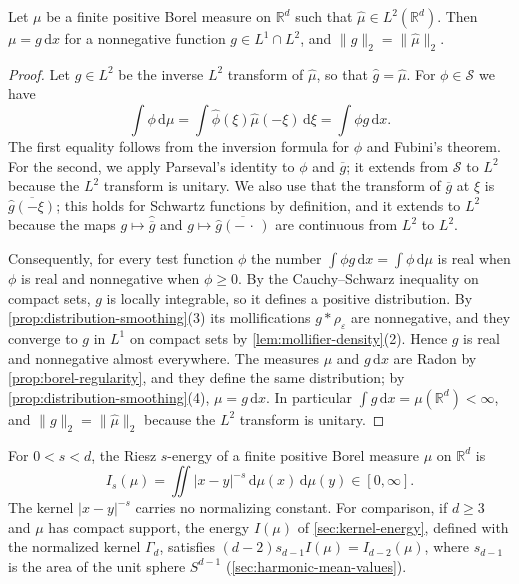 \begin{proposition}\label{prop:measure-fourier-l2}
Let $\mu$ be a finite positive Borel measure on $\mathbb R^d$ such that $\widehat\mu\in L^2(\mathbb R^d)$. Then $\mu=g\,\mathrm d x$ for a nonnegative function $g\in L^1\cap L^2$, and $\|g\|_2=\|\widehat\mu\|_2$.
\end{proposition}
\begin{proof}
Let $g\in L^2$ be the inverse $L^2$ transform of $\widehat\mu$, so that $\widehat g=\widehat\mu$. For $\phi\in\mathcal S$ we have
\[
 \int\phi\,\mathrm d\mu=\int\widehat\phi(\xi)\widehat\mu(-\xi)\,\mathrm d\xi=\int\phi g\,\mathrm d x.
\]
The first equality follows from the inversion formula for $\phi$ and Fubini's theorem. For the second, we apply Parseval's identity to $\phi$ and $\overline g$; it extends from $\mathcal S$ to $L^2$ because the $L^2$ transform is unitary. We also use that the transform of $\overline g$ at $\xi$ is $\overline{\widehat g(-\xi)}$; this holds for Schwartz functions by definition, and it extends to $L^2$ because the maps $g\mapsto\widehat{\overline g}$ and $g\mapsto\overline{\widehat g(-\,\cdot\,)}$ are continuous from $L^2$ to $L^2$.

Consequently, for every test function $\phi$ the number $\int\phi g\,\mathrm d x=\int\phi\,\mathrm d\mu$ is real when $\phi$ is real and nonnegative when $\phi\geq0$. By the Cauchy--Schwarz inequality on compact sets, $g$ is locally integrable, so it defines a positive distribution. By \cref{prop:distribution-smoothing}(3) its mollifications $g*\rho_\varepsilon$ are nonnegative, and they converge to $g$ in $L^1$ on compact sets by \cref{lem:mollifier-density}(2). Hence $g$ is real and nonnegative almost everywhere. The measures $\mu$ and $g\,\mathrm d x$ are Radon by \cref{prop:borel-regularity}, and they define the same distribution; by \cref{prop:distribution-smoothing}(4), $\mu=g\,\mathrm d x$. In particular $\int g\,\mathrm d x=\mu(\mathbb R^d)<\infty$, and $\|g\|_2=\|\widehat\mu\|_2$ because the $L^2$ transform is unitary.
\end{proof}

For $0<s<d$, the Riesz $s$-energy of a finite positive Borel measure $\mu$ on $\mathbb R^d$ is
\[
 I_s(\mu)=\iint|x-y|^{-s}\,\mathrm d\mu(x)\,\mathrm d\mu(y)\in[0,\infty].
\]
The kernel $|x-y|^{-s}$ carries no normalizing constant. For comparison, if $d\geq3$ and $\mu$ has compact support, the energy $I(\mu)$ of \cref{sec:kernel-energy}, defined with the normalized kernel $\Gamma_d$, satisfies $(d-2)s_{d-1}I(\mu)=I_{d-2}(\mu)$, where $s_{d-1}$ is the area of the unit sphere $S^{d-1}$ (\cref{sec:harmonic-mean-values}).

